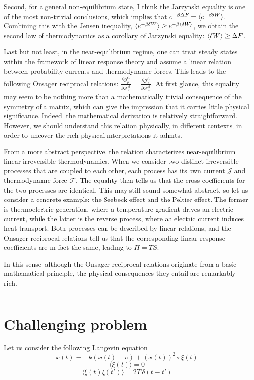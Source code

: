 \documentclass[11pt]{article}
\begin{document}
	
	Second, for a general non-equilibrium state, I think the Jarzynski equality is one of the most non-trivial conclusions, which implies that $e^{-\beta \Delta F}=\braket{e^{-\beta \delta W}}$. Combining this with the Jensen inequality, $\braket{e^{-\beta\delta W}}\geq e^{-\beta \braket{\delta W}}$, we obtain the second law of thermodynamics as a corollary of Jarzynski equality: $\braket{\delta W}\geq \Delta F$. 
	
	Last but not least, in the near-equilibrium regime, one can treat steady states within the framework of linear response theory and assume a linear relation between probability currents and thermodynamic forces. This leads to the following Onsager reciprocal relations: $\frac{\partial\mathcal{J}_\mu^{\mathrm{st}}}{\partial\mathcal{F}_\nu^{\mathrm{st}}}=\frac{\partial\mathcal{J}_\nu^{\mathrm{st}}}{\partial\mathcal{F}_\mu^{\mathrm{st}}}$. At first glance, this equality may seem to be nothing more than a mathematically trivial consequence of the symmetry of a matrix, which can give the impression that it carries little physical significance. Indeed, the mathematical derivation is relatively straightforward. However, we should understand this relation physically, in different contexts, in order to uncover the rich physical interpretations it admits.
	
	From a more abstract perspective, the relation characterizes near-equilibrium linear irreversible thermodynamics. When we consider two distinct irreversible processes that are coupled to each other, each process has its own current $\mathcal{J}$ and thermodynamic force $\mathcal{F}$. The equality then tells us that the cross-coefficients for the two processes are identical. This may still sound somewhat abstract, so let us consider a concrete example: the Seebeck effect and the Peltier effect. The former is thermoelectric generation, where a temperature gradient drives an electric current, while the latter is the reverse process, where an electric current induces heat transport. Both processes can be described by linear relations, and the Onsager reciprocal relations tell us that the corresponding linear-response coefficients are in fact the same, leading to $\Pi = T S$.
	
	In this sense, although the Onsager reciprocal relations originate from a basic mathematical principle, the physical consequences they entail are remarkably rich.
	
	\bigskip\hrule\bigskip
	\section{Challenging problem}
	Let us consider the following Langevin equation
	\begin{equation}
		\dot{x}(t) = -k(x(t)-a) + (x(t))^2\circ \xi(t)
		\tag{8}
	\end{equation}
	\begin{equation}
		\langle \xi(t)\rangle = 0
		\tag{9}
	\end{equation}
	\begin{equation}
		\langle \xi(t)\xi(t')\rangle = 2T\,\delta(t-t')
		\tag{10}
	\end{equation}
	
\end{document}
